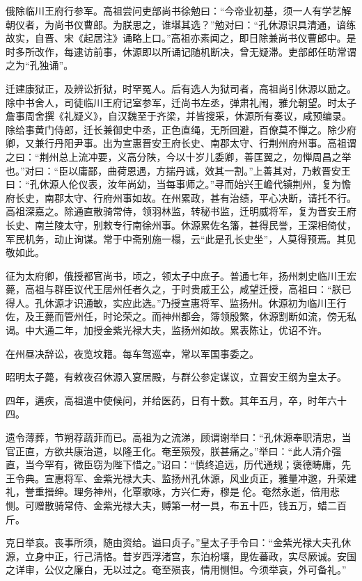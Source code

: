 \documentclass[12pt,UTF8]{ctexbook}
\begin{document}
俄除临川王府行参军。高祖尝问吏部尚书徐勉曰：“今帝业初基，须一人有学艺解朝仪者，为尚书仪曹郎。为朕思之，谁堪其选？”勉对曰：“孔休源识具清通，谙练故实，自晋、宋《起居注》诵略上口。”高祖亦素闻之，即日除兼尚书仪曹郎中。是时多所改作，每逮访前事，休源即以所诵记随机断决，曾无疑滞。吏部郎任昉常谓之为“孔独诵”。

迁建康狱正，及辨讼折狱，时罕冤人。后有选人为狱司者，高祖尚引休源以励之。除中书舍人，司徒临川王府记室参军，迁尚书左丞，弹肃礼闱，雅允朝望。时太子詹事周舍撰《礼疑义》，自汉魏至于齐梁，并皆搜采，休源所有奏议，咸预编录。除给事黄门侍郎，迁长兼御史中丞，正色直绳，无所回避，百僚莫不惮之。除少府卿，又兼行丹阳尹事。出为宣惠晋安王府长史、南郡太守、行荆州府州事。高祖谓之曰：“荆州总上流冲要，义高分陕，今以十岁儿委卿，善匡翼之，勿惮周昌之举也。”对曰：“臣以庸鄙，曲荷恩遇，方揣丹诚，效其一割。”上善其对，乃敕晋安王曰：“孔休源人伦仪表，汝年尚幼，当每事师之。”寻而始兴王嶦代镇荆州，复为憺府长史，南郡太守、行府州事如故。在州累政，甚有治绩，平心决断，请托不行。高祖深嘉之。除通直散骑常侍，领羽林监，转秘书监，迁明威将军，复为晋安王府长史、南兰陵太守，别敕专行南徐州事。休源累佐名籓，甚得民誉，王深相倚仗，军民机务，动止询谋。常于中斋别施一榻，云“此是孔长史坐”，人莫得预焉。其见敬如此。

征为太府卿，俄授都官尚书，顷之，领太子中庶子。普通七年，扬州刺史临川王宏薨，高祖与群臣议代王居州任者久之，于时贵戚王公，咸望迁授，高祖曰：“朕已得人。孔休源才识通敏，实应此选。”乃授宣惠将军、监扬州。休源初为临川王行佐，及王薨而管州任，时论荣之。而神州都会，簿领殷繁，休源割断如流，傍无私谒。中大通二年，加授金紫光禄大夫，监扬州如故。累表陈让，优诏不许。

在州昼决辞讼，夜览坟籍。每车驾巡幸，常以军国事委之。

昭明太子薨，有敕夜召休源入宴居殿，与群公参定谋议，立晋安王纲为皇太子。

四年，遘疾，高祖遣中使候问，并给医药，日有十数。其年五月，卒，时年六十四。

遗令薄葬，节朔荐蔬菲而已。高祖为之流涕，顾谓谢举曰：“孔休源奉职清忠，当官正直，方欲共康治道，以隆王化。奄至殒殁，朕甚痛之。”举曰：“此人清介强直，当今罕有，微臣窃为陛下惜之。”诏曰：“慎终追远，历代通规；褒德畴庸，先王令典。宣惠将军、金紫光禄大夫、监扬州孔休源，风业贞正，雅量冲邈，升荣建礼，誉重搢绅。理务神州，化覃歌咏，方兴仁寿，穆是伦。奄然永逝，倍用悲恻。可赠散骑常侍、金紫光禄大夫，赙第一材一具，布五十匹，钱五万，蜡二百斤。

克日举哀。丧事所须，随由资给。谥曰贞子。”皇太子手令曰：“金紫光禄大夫孔休源，立身中正，行己清恪。昔岁西浮渚宫，东泊枌壤，毘佐蕃政，实尽厥诚。安国之详审，公仪之廉白，无以过之。奄至殒丧，情用恻怛。今须举哀，外可备礼。”
\end{document}
